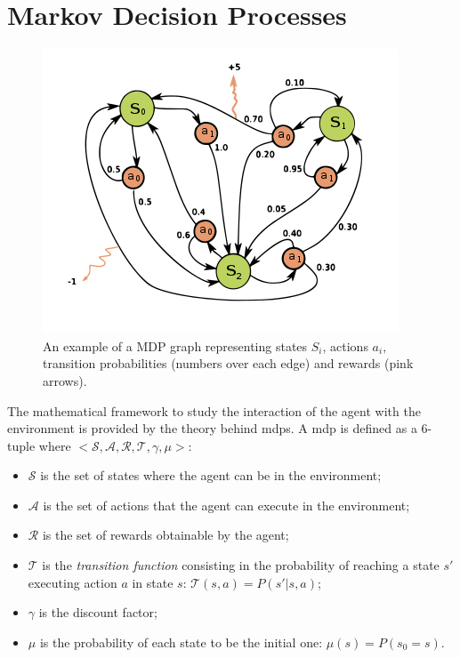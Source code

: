 \section{Markov Decision Processes}
\begin{figure}[t]
\begin{minipage}{\textwidth}
\begin{center}
  \includegraphics[scale=.6]{img/mdp2.png}
\end{center}
\end{minipage}
\caption[Markov Decision Process]{An example of a MDP graph representing states $S_i$, actions $a_i$, transition probabilities (numbers over each edge) and rewards (pink arrows).}\label{F:mdp2}
\end{figure}
The mathematical framework to study the interaction of the agent with the environment is provided by the theory behind \glspl{mdp}. A \gls{mdp} is defined as a $6$-tuple where $<\mathcal{S}, \mathcal{A}, \mathcal{R}, \mathcal{T}, \gamma, \mu>$:
\begin{itemize}
 \item $\mathcal{S}$ is the set of states where the agent can be in the environment;
 \item $\mathcal{A}$ is the set of actions that the agent can execute in the environment;
 \item $\mathcal{R}$ is the set of rewards obtainable by the agent;
 \item $\mathcal{T}$ is the \textit{transition function} consisting in the probability of reaching a state $s'$ executing action $a$ in state $s$: $\mathcal{T}(s, a) = P(s' | s, a)$;
 \item $\gamma$ is the discount factor;
 \item $\mu$ is the probability of each state to be the initial one: $\mu(s) = P(s_0 = s)$.
\end{itemize}
